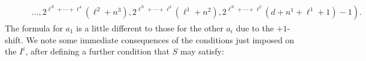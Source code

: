 \documentclass[10pt]{article}
\newcommand{\LL}[1]{\ifblank{#1}{\scrK}{\scrK^{#1}}}
\newcommand{\nontop}[1]{\ifblank{#1}{\scrU}{\scrU^{#1}}}
\renewcommand{\Q}{Q}
\newcommand{\SqShift}{\Sq_{\smash{+}}}
\newcommand{\Sq}{\mathrm{Sq}}
\newcommand{\minDim}{m}
\newcommand{\minDimP}{\overline{m}}
\begin{document}
\begin{SequenceOfSequencesIntro}
\begin{align*}
 &\qquad \left.{}\ldots,2^{\ell^N+\cdots+\ell^{4}}(\ell^2+n^3),2^{\ell^N+\cdots+\ell^{3}}(\ell^1+n^2),2^{\ell^N+\cdots+\ell^{2}}(d+n^1+\ell^1+1)-1 \right).
\end{align*}
The formula for $a_1$ is a little different to those for the other $a_i$ due to the $+1$-shift.
We note some immediate consequences of the conditions just imposed on the $I^i$, after defining a further condition that $S$ may satisfy:
\begin{enumerate}[A)]
\squishlist

\end{enumerate}
\end{SequenceOfSequencesIntro}
\end{document}
